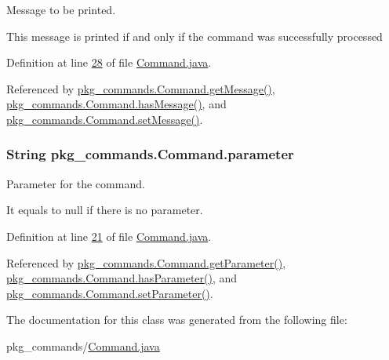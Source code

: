 Message to be printed. 

This message is printed if and only if the command was successfully processed 

Definition at line \hyperlink{Command_8java_source_l00028}{28} of file \hyperlink{Command_8java_source}{Command.\-java}.



Referenced by \hyperlink{Command_8java_source_l00066}{pkg\-\_\-commands.\-Command.\-get\-Message()}, \hyperlink{Command_8java_source_l00074}{pkg\-\_\-commands.\-Command.\-has\-Message()}, and \hyperlink{Command_8java_source_l00058}{pkg\-\_\-commands.\-Command.\-set\-Message()}.

\hypertarget{classpkg__commands_1_1Command_a089fe1b30b43b2ad5f0dcb2f0ffc2fdd}{
\subsubsection[{parameter}]{\setlength{\rightskip}{0pt plus 5cm}String pkg\-\_\-commands.\-Command.\-parameter\hspace{0.3cm}{\ttfamily [private]}}}\label{classpkg__commands_1_1Command_a089fe1b30b43b2ad5f0dcb2f0ffc2fdd}


Parameter for the command. 

It equals to null if there is no parameter. 

Definition at line \hyperlink{Command_8java_source_l00021}{21} of file \hyperlink{Command_8java_source}{Command.\-java}.



Referenced by \hyperlink{Command_8java_source_l00034}{pkg\-\_\-commands.\-Command.\-get\-Parameter()}, \hyperlink{Command_8java_source_l00050}{pkg\-\_\-commands.\-Command.\-has\-Parameter()}, and \hyperlink{Command_8java_source_l00042}{pkg\-\_\-commands.\-Command.\-set\-Parameter()}.



The documentation for this class was generated from the following file\-:\begin{DoxyCompactItemize}
\item 
pkg\-\_\-commands/\hyperlink{Command_8java}{Command.\-java}\end{DoxyCompactItemize}
